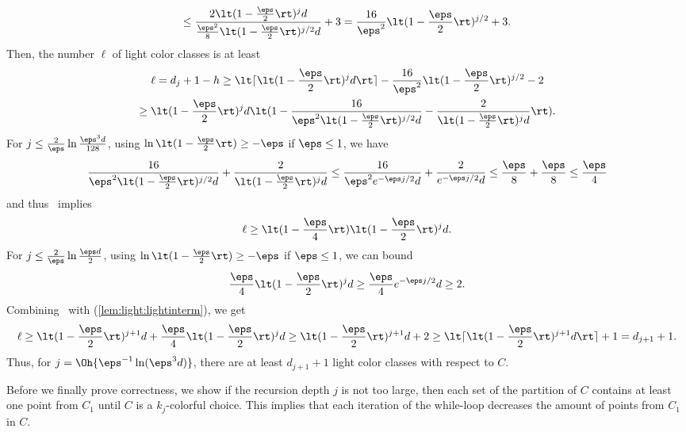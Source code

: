 \begin{prf}
\begin{equation*}
  \leq \frac{2 \lt(1-\frac{\eps}{2}\rt)^j d}{\frac{\eps^2}{8}
      \lt(1-\frac{\eps}{2}\rt)^{j/2} d} + 3
  = \frac{16}{\eps^2} \lt(1-\frac{\eps}{2}\rt)^{j/2} + 3.
\end{equation*}
Then, the number $\ell$ of light color classes is at least
\begin{multline}\label{lem:light:light1}
    \ell = d_j + 1 - h
    \geq \lt\lceil \lt(1-\frac{\eps}{2}\rt)^j d \rt\rceil - 
    \frac{16}{\eps^2}
        \lt(1-\frac{\eps}{2}\rt)^{j/2} - 2
    \\
    \geq \lt(1-\frac{\eps}{2}\rt)^j d \lt(1 - \frac{16}{\eps^2
          \lt(1-\frac{\eps}{2}\rt)^{j/2} d} -
    \frac{2}{\lt(1-\frac{\eps}{2}\rt)^j d} \rt).
\end{multline}
For $j \leq \frac{2}{\eps}\ln \frac{\eps^3 d}{128}$, using
$\ln \lt(1-\frac{\eps}{2}\rt) \geq  -\eps$ if $\eps \leq 1$, we have
\begin{equation*}
    \frac{16}{\eps^2 \lt(1-\frac{\eps}{2}\rt)^{j/2} d} +
    \frac{2}{\lt(1-\frac{\eps}{2}\rt)^j d} 
 \leq    \frac{16}{\eps^2 e^{-\eps j/2} d} +
    \frac{2}{e^{-\eps j/2} d}
    \leq \frac{\eps}{8} + \frac{\eps}{8}  
    \leq \frac{\eps}{4}
\end{equation*}
and thus~ implies
\begin{equation}\label{lem:light:lightinterm}
  \ell \geq \lt(1-\frac{\eps}{4}\rt)\lt(1-\frac{\eps}{2}\rt)^j d.
\end{equation}
For $j \leq \frac{2}{\eps}\ln \frac{\eps d}{2}$, using
$\ln \lt(1-\frac{\eps}{2}\rt) \geq  -\eps$ if $\eps \leq 1$, we can bound
\begin{equation}\label{lem:light:epshalf}
  \frac{\eps}{4} \lt(1-\frac{\eps}{2}\rt)^j d 
  \geq \frac{\eps}{4} e^{-\eps j/2} d \geq 2.
\end{equation}
Combining~ with (\ref{lem:light:lightinterm}), we get
\[
  \ell
  \geq \lt(1-\frac{\eps}{2}\rt)^{j+1} d
      + \frac{\eps}{4} \lt(1 - \frac{\eps}{2}\rt)^j d
  \geq \lt(1-\frac{\eps}{2}\rt)^{j+1} d + 2
  \geq \lt\lceil \lt(1-\frac{\eps}{2}\rt)^{j+1} d \rt\rceil + 1
  = d_{j+1} + 1.
\]
Thus, for $j = \Oh{\eps^{-1} \ln (\eps^3 d)}$, there are at least $d_{j+1}
+1$ light color classes with respect to $C$.
\end{prf}

Before we finally prove correctness, we show if the recursion depth 
$j$ is not too large, then each set of the partition of $C$ contains 
at least one point from $C_1$ until $C$ is a $k_j$-colorful choice. 
This implies that each iteration of
the while-loop decreases the amount of points from $C_1$ in $C$.

